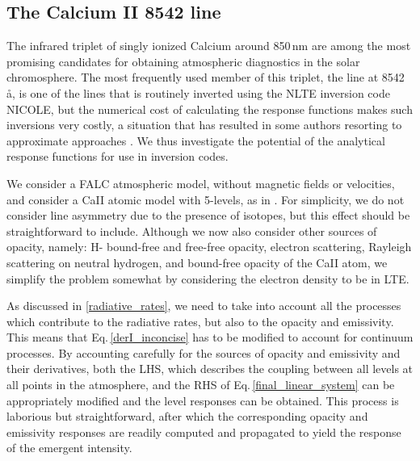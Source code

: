 \documentclass{aa}
\begin{document}
\subsection{The Calcium II 8542 line}
\label{CaII}

The infrared triplet of singly ionized Calcium around 850\,nm are among the most promising candidates for obtaining atmospheric diagnostics \citep[see][for an in depth discussion of response function and diagnostic capabilities]{Ca_diag_Jaime} in the solar chromosphere. The most frequently used member of this triplet, the line at 8542\,\aa, is one of the lines that is routinely inverted using the NLTE inversion code NICOLE, but the numerical cost of calculating the response functions makes such inversions very costly, a situation that has resulted in some authors resorting to approximate approaches \citep{Beck_inversion_2015}. We thus investigate the potential of the analytical response functions for use in inversion codes.

We consider a FALC atmospheric model, without magnetic fields or velocities, and consider a CaII atomic model with 5-levels, as in \citet{Ca_diag_Jaime}. For simplicity, we do not consider line asymmetry due to the presence of isotopes, but this effect should be straightforward to include. Although we now also consider other sources of opacity, namely: H- bound-free and free-free opacity, electron scattering, Rayleigh scattering on neutral hydrogen, and bound-free opacity of the CaII atom, we simplify the problem somewhat by considering the electron density to be in LTE. 

As discussed in \ref{radiative_rates}, we need to take into account all the processes which contribute to the radiative rates, but also to the opacity and emissivity. This means that Eq.\,\ref{derI_inconcise} has to be modified to account for continuum processes. By accounting carefully for the sources of opacity and emissivity and their derivatives, both the LHS, which describes the coupling between all levels at all points in the atmosphere, and the RHS of Eq.\,\ref{final_linear_system} can be appropriately modified and the level responses can be obtained. This process is laborious but straightforward, after which the corresponding opacity and emissivity responses are readily computed and propagated to yield the response of the emergent intensity.
\end{document}
